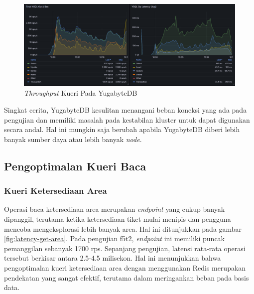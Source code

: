 \begin{figure}[htbp]
    \centering
    \includegraphics[width=1\textwidth]{resources/chapter-4/yugabyte-ops.png}
    \caption{\textit{Throughput} Kueri Pada YugabyteDB}
    \label{fig:yugabytedb-throughput}
\end{figure}

Singkat cerita, YugabyteDB kesulitan menangani beban koneksi yang ada pada pengujian dan memiliki masalah pada kestabilan kluster untuk dapat digunakan secara andal. Hal ini mungkin saja berubah apabila YugabyteDB diberi lebih banyak sumber daya atau lebih banyak \textit{node}.

\subsection{Pengoptimalan Kueri Baca}

\subsubsection{Kueri Ketersediaan Area}

Operasi baca ketersediaan area merupakan \textit{endpoint} yang cukup banyak dipanggil, terutama ketika ketersediaan tiket mulai menipis dan pengguna mencoba mengeksplorasi lebih banyak area. Hal ini ditunjukkan pada gambar \ref{fig:latency-get-area}. Pada pengujian f5t2, \textit{endpoint} ini memiliki puncak pemanggilan sebanyak 1700 rps. Sepanjang pengujian, latensi rata-rata operasi tersebut berkisar antara 2.5-4.5 milisekon. Hal ini menunjukkan bahwa pengoptimalan kueri ketersediaan area dengan menggunakan Redis merupakan pendekatan yang sangat efektif, terutama dalam meringankan beban pada basis data.

